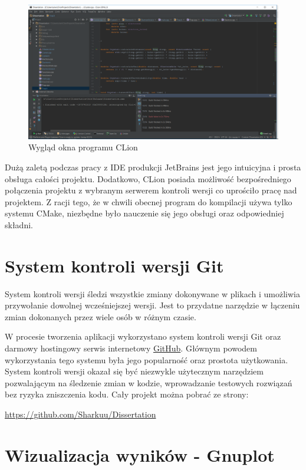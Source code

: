 \begin{figure}[h]
\centering
\includegraphics[width=17cm]{clion}
\caption{Wygląd okna programu CLion \cite{struktura_pasmowa}}
\label{fig:clion}
\end{figure}

Dużą zaletą podczas pracy z IDE produkcji JetBrains jest jego intuicyjna i prosta obsługa całości projektu. Dodatkowo, CLion posiada możliwość bezpośredniego połączenia projektu z wybranym serwerem kontroli wersji co uprościło pracę nad projektem. Z racji tego, że w chwili obecnej program do kompilacji używa tylko systemu CMake, niezbędne było nauczenie się jego obsługi  oraz odpowiedniej składni.

\section{System kontroli wersji Git}

System kontroli wersji śledzi wszystkie zmiany dokonywane w plikach i umożliwia przywołanie dowolnej wcześniejszej wersji. Jest to przydatne narzędzie w łączeniu zmian dokonanych przez wiele osób w różnym czasie.

W procesie tworzenia aplikacji wykorzystano system kontroli wersji Git oraz darmowy hostingowy serwis internetowy \href{https://github.com/}{GitHub}.
Głównym powodem wykorzystania tego systemu była jego popularność oraz prostota użytkowania.
System kontroli wersji okazał się być niezwykle użytecznym narzędziem pozwalającym na
śledzenie zmian w kodzie, wprowadzanie testowych rozwiązań bez
ryzyka zniszczenia kodu. Cały projekt można pobrać ze strony:
\begin{center}
\url{https://github.com/Sharkuu/Dissertation}
\end{center}

\section{Wizualizacja wyników - Gnuplot}

